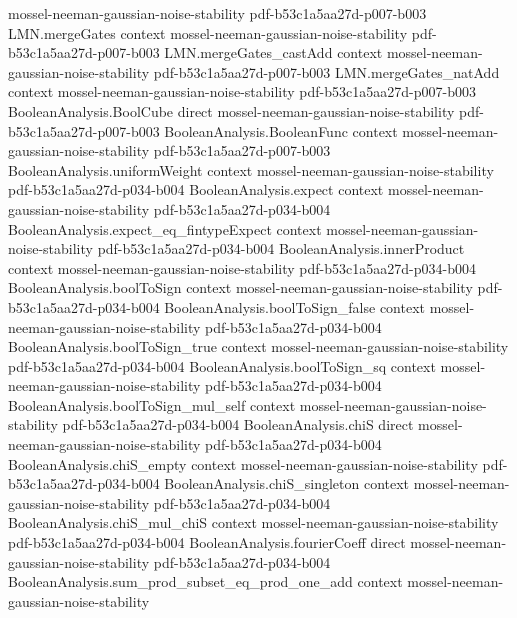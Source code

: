 \begin{theorem}
  {mossel-neeman-gaussian-noise-stability}
  {pdf-b53c1a5aa27d-p007-b003}
\proofstep
  {LMN.mergeGates}
  {context}
  {mossel-neeman-gaussian-noise-stability}
  {pdf-b53c1a5aa27d-p007-b003}
\proofstep
  {LMN.mergeGates_castAdd}
  {context}
  {mossel-neeman-gaussian-noise-stability}
  {pdf-b53c1a5aa27d-p007-b003}
\proofstep
  {LMN.mergeGates_natAdd}
  {context}
  {mossel-neeman-gaussian-noise-stability}
  {pdf-b53c1a5aa27d-p007-b003}
\proofstep
  {BooleanAnalysis.BoolCube}
  {direct}
  {mossel-neeman-gaussian-noise-stability}
  {pdf-b53c1a5aa27d-p007-b003}
\proofstep
  {BooleanAnalysis.BooleanFunc}
  {context}
  {mossel-neeman-gaussian-noise-stability}
  {pdf-b53c1a5aa27d-p007-b003}
\proofstep
  {BooleanAnalysis.uniformWeight}
  {context}
  {mossel-neeman-gaussian-noise-stability}
  {pdf-b53c1a5aa27d-p034-b004}
\proofstep
  {BooleanAnalysis.expect}
  {context}
  {mossel-neeman-gaussian-noise-stability}
  {pdf-b53c1a5aa27d-p034-b004}
\proofstep
  {BooleanAnalysis.expect_eq_fintypeExpect}
  {context}
  {mossel-neeman-gaussian-noise-stability}
  {pdf-b53c1a5aa27d-p034-b004}
\proofstep
  {BooleanAnalysis.innerProduct}
  {context}
  {mossel-neeman-gaussian-noise-stability}
  {pdf-b53c1a5aa27d-p034-b004}
\proofstep
  {BooleanAnalysis.boolToSign}
  {context}
  {mossel-neeman-gaussian-noise-stability}
  {pdf-b53c1a5aa27d-p034-b004}
\proofstep
  {BooleanAnalysis.boolToSign_false}
  {context}
  {mossel-neeman-gaussian-noise-stability}
  {pdf-b53c1a5aa27d-p034-b004}
\proofstep
  {BooleanAnalysis.boolToSign_true}
  {context}
  {mossel-neeman-gaussian-noise-stability}
  {pdf-b53c1a5aa27d-p034-b004}
\proofstep
  {BooleanAnalysis.boolToSign_sq}
  {context}
  {mossel-neeman-gaussian-noise-stability}
  {pdf-b53c1a5aa27d-p034-b004}
\proofstep
  {BooleanAnalysis.boolToSign_mul_self}
  {context}
  {mossel-neeman-gaussian-noise-stability}
  {pdf-b53c1a5aa27d-p034-b004}
\proofstep
  {BooleanAnalysis.chiS}
  {direct}
  {mossel-neeman-gaussian-noise-stability}
  {pdf-b53c1a5aa27d-p034-b004}
\proofstep
  {BooleanAnalysis.chiS_empty}
  {context}
  {mossel-neeman-gaussian-noise-stability}
  {pdf-b53c1a5aa27d-p034-b004}
\proofstep
  {BooleanAnalysis.chiS_singleton}
  {context}
  {mossel-neeman-gaussian-noise-stability}
  {pdf-b53c1a5aa27d-p034-b004}
\proofstep
  {BooleanAnalysis.chiS_mul_chiS}
  {context}
  {mossel-neeman-gaussian-noise-stability}
  {pdf-b53c1a5aa27d-p034-b004}
\proofstep
  {BooleanAnalysis.fourierCoeff}
  {direct}
  {mossel-neeman-gaussian-noise-stability}
  {pdf-b53c1a5aa27d-p034-b004}
\proofstep
  {BooleanAnalysis.sum_prod_subset_eq_prod_one_add}
  {context}
  {mossel-neeman-gaussian-noise-stability}

\end{theorem}
